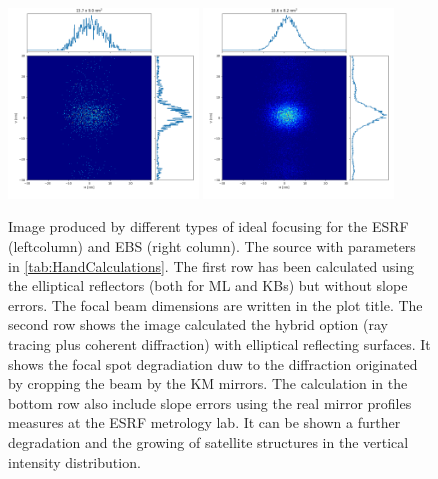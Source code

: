 \documentclass{iucr}              %
\begin{document}
\begin{figure}
\includegraphics[width=0.45\textwidth]{GRAPHICS/hybriderrorsESRF.png}
\includegraphics[width=0.45\textwidth]{GRAPHICS/hybriderrorsEBS.png}

\caption{Image produced by different types of ideal focusing for the ESRF (leftcolumn) and EBS (right column). The source with parameters in 
\ref{tab:HandCalculations}. 
The first row has been calculated using the elliptical reflectors (both for ML and KBs) but without slope errors. The focal beam dimensions are written in the plot title.
The second row shows the image calculated the hybrid option (ray tracing plus coherent diffraction) with elliptical reflecting surfaces. It shows the focal spot degradiation duw to the diffraction originated by cropping the beam by the KM mirrors. The calculation in the bottom row also include slope errors using the real mirror profiles measures at the ESRF metrology lab. It can be shown a further degradation and the growing of satellite structures in the vertical intensity distribution. 
}
\end{figure}
\end{document}
